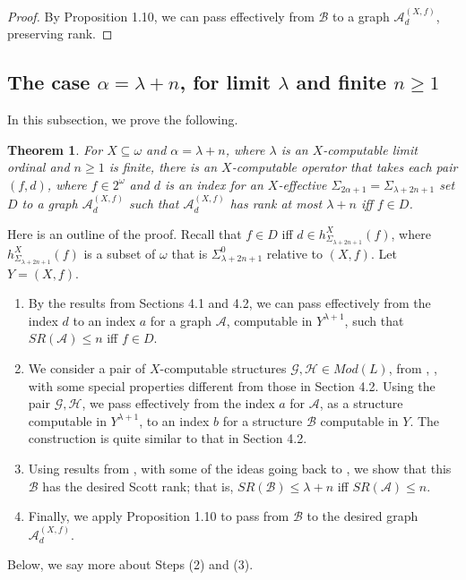 \documentclass{article}
\newtheorem{thm}{Theorem}[section]
\begin{document}
\begin{proof}
By Proposition 1.10, we can pass effectively from $\mathcal{B}$ to a graph $\mathcal{A}^{(X,f)}_d$, preserving rank.  
\end{proof}  

\subsection{The case $\alpha = \lambda + n$, for limit $\lambda$ and finite $n\geq 1$}

In this subsection, we prove the following.

\begin{thm}

For $X\subseteq\omega$ and $\alpha = \lambda + n$, where $\lambda$ is an $X$-computable limit ordinal and $n\geq 1$ is finite, there is an $X$-computable operator that takes each pair $(f,d)$, where $f\in 2^\omega$ and $d$ is an index for an $X$-effective $\Sigma_{2\alpha+1}=\Sigma_{\lambda + 2n+1}$ set $D$ to a graph $\mathcal{A}^{(X,f)}_d$ such that $\mathcal{A}^{(X,f)}_d$ has rank at most $\lambda + n$ iff $f\in D$.   

\end{thm}

Here is an outline of the proof.  Recall that $f\in D$ iff $d\in h^X_{\Sigma_{\lambda+2n+1}}(f)$, where $h^X_{\Sigma_{\lambda+2n+1}}(f)$ is a subset of $\omega$ that is $\Sigma^0_{\lambda+2n+1}$ relative to $(X,f)$.  Let $Y = (X,f)$.    

\begin{enumerate}

\item  By the results from Sections 4.1 and 4.2, we can pass effectively from the index $d$ to an index $a$ for a graph $\mathcal{A}$, computable in $Y^{\lambda+1}$, such that $SR(\mathcal{A})\leq n$ iff $f\in D$.  

\item  We consider a pair of $X$-computable structures $\mathcal{G},\mathcal{H}\in Mod(L)$, from \cite{CGHT}, \cite{GHKMMS}, with some special properties different from those in Section 4.2.
Using the pair $\mathcal{G},\mathcal{H}$, we pass effectively from the index $a$ for $\mathcal{A}$, as a structure computable in $Y^{\lambda+1}$, to an index $b$ for a structure $\mathcal{B}$ computable in $Y$.  The construction is quite similar to that in Section 4.2.    

\item  Using results from \cite{CGHT}, with some of the ideas going back to \cite{Maher}, we show that this $\mathcal{B}$ has the desired Scott rank; that is, $SR(\mathcal{B})\leq \lambda+n$ iff ${SR(\mathcal{A})\leq n}$.  

\item  Finally, we apply Proposition 1.10 to pass from $\mathcal{B}$ to the desired graph 
$\mathcal{A}^{(X,f)}_d$.       

\end{enumerate}
Below, we say more about Steps (2) and (3).
\end{document}
